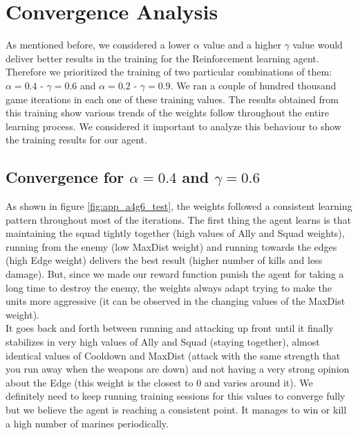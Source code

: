 
\section{Convergence Analysis}

As mentioned before, we considered a lower $\alpha$ value and a higher $\gamma$ value would deliver better results in the training for the Reinforcement learning agent. Therefore we prioritized the training of two particular combinations of them: $\alpha= 0.4$ - $\gamma = 0.6$ and $\alpha= 0.2$ - $\gamma = 0.9$. We ran a couple of hundred thousand game iterations in each one of these training values. The results obtained from this training show various trends of the weights follow throughout the entire learning process. We considered it important to analyze this behaviour to show the training results for our agent. \\

\subsection*{Convergence for $\alpha= 0.4$ and $\gamma = 0.6$}

As shown in figure \ref{fig:app_a4g6_test}, the weights followed a consistent learning pattern throughout most of the iterations. The first thing the agent learns is that maintaining the squad tightly together (high values of Ally and Squad weights), running from the enemy (low MaxDist weight) and running towards the edges (high Edge weight) delivers the best result (higher number of kills and less damage). But, since we made our reward function punish the agent for taking a long time to destroy the enemy, the weights always adapt trying to make the units more aggressive (it can be observed in the changing values of the MaxDist weight).\\

It goes back and forth between running and attacking up front until it finally stabilizes in very high values of Ally and Squad (staying together), almost identical values of Cooldown and MaxDist (attack with the same strength that you run away when the weapons are down) and not having a very strong opinion about the Edge (this weight is the closest to 0 and varies around it). We definitely need to keep running training sessions for this values to converge fully but we believe the agent is reaching a consistent point. It manages to win or kill a high number of marines periodically. 